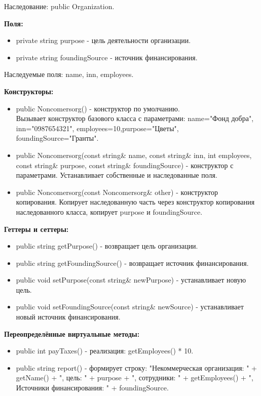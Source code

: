 \documentclass[oneside,a4paper,14pt]{extarticle}
\begin{document}
    Наследование: public Organization.

    \textbf{Поля:}
    \begin{itemize}
        \item private string purpose - цель деятельности организации.
        \item private string foundingSource - источник финансирования.
    \end{itemize}

    Наследуемые поля: name, inn, employees.

    \textbf{Конструкторы:}
    \begin{itemize}
        \item public Noncomersorg() - конструктор по умолчанию.\\ Вызывает конструктор базового класса с параметрами: name="Фонд добра", inn="0987654321", employees=10,purpose="Цветы", foundingSource="Гранты".
        \item public Noncomersorg(const string\& name, const string\& inn, int employees, const string\& purpose, const string\& foundingSource) - конструктор с параметрами. Устанавливает собственные и наследованные поля.
        \item public Noncomersorg(const Noncomersorg\& other) - конструктор копирования. Копирует наследованную часть через конструктор копирования наследованного класса, копирует purpose и foundingSource.
    \end{itemize}

    \textbf{Геттеры и сеттеры:}
    \begin{itemize}
        \item public string getPurpose() - возвращает цель организации.
        \item public string getFoundingSource() - возвращает источник финансирования.
        \item public void setPurpose(const string\& newPurpose) - устанавливает новую цель.
        \item public void setFoundingSource(const string\& newSource) - устанавливает новый источник финансирования.
    \end{itemize}

    \newpage

    \textbf{Переопределённые виртуальные методы:}
    \begin{itemize}
        \item public int payTaxes() - реализация: getEmployees() * 10.
        \item public string report() - формирует строку: "Некоммерческая организация: " + getName() + ", цель: " + purpose + ", сотрудники: " + getEmployees() + ", Источники финансирования: " + foundingSource.
    \end{itemize}
\end{document}
